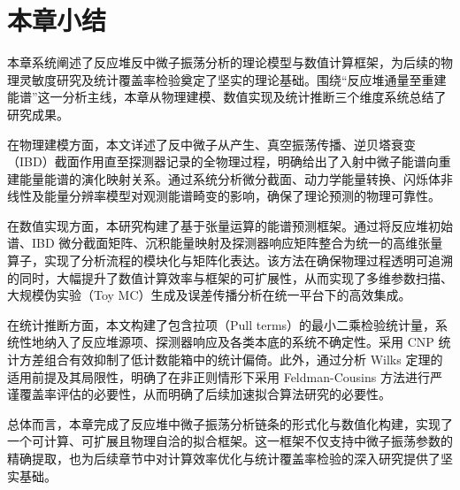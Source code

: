 \section{本章小结}
\label{sec:ch2_summary}
本章系统阐述了反应堆反中微子振荡分析的理论模型与数值计算框架，为后续的物理灵敏度研究及统计覆盖率检验奠定了坚实的理论基础。围绕“反应堆通量至重建能谱”这一分析主线，本章从物理建模、数值实现及统计推断三个维度系统总结了研究成果。

在物理建模方面，本文详述了反中微子从产生、真空振荡传播、逆贝塔衰变（IBD）截面作用直至探测器记录的全物理过程，明确给出了入射中微子能谱向重建能量能谱的演化映射关系。通过系统分析微分截面、动力学能量转换、闪烁体非线性及能量分辨率模型对观测能谱畸变的影响，确保了理论预测的物理可靠性。

在数值实现方面，本研究构建了基于张量运算的能谱预测框架。通过将反应堆初始谱、IBD 微分截面矩阵、沉积能量映射及探测器响应矩阵整合为统一的高维张量算子，实现了分析流程的模块化与矩阵化表达。该方法在确保物理过程透明可追溯的同时，大幅提升了数值计算效率与框架的可扩展性，从而实现了多维参数扫描、大规模伪实验（Toy MC）生成及误差传播分析在统一平台下的高效集成。


在统计推断方面，本文构建了包含拉项（Pull terms）的最小二乘检验统计量，系统性地纳入了反应堆源项、探测器响应及各类本底的系统不确定性。采用 CNP 统计方差组合有效抑制了低计数能箱中的统计偏倚。此外，通过分析 Wilks 定理的适用前提及其局限性，明确了在非正则情形下采用 Feldman-Cousins 方法进行严谨覆盖率评估的必要性，从而明确了后续加速拟合算法研究的必要性。

总体而言，本章完成了反应堆中微子振荡分析链条的形式化与数值化构建，实现了一个可计算、可扩展且物理自洽的拟合框架。这一框架不仅支持中微子振荡参数的精确提取，也为后续章节中对计算效率优化与统计覆盖率检验的深入研究提供了坚实基础。
